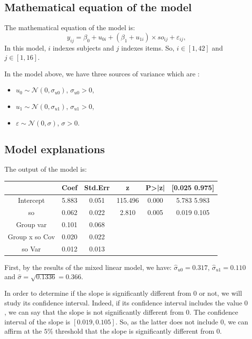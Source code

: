 \documentclass{article}
\begin{document}
\subsection{Mathematical equation of the model}
The mathematical equation of the model is:
\[y_{ij}= \beta_0 + u_{0i} + (\beta_1 + u_{1i}) \times so_{ij} + \varepsilon_{ij},\]
In this model, $i$ indexes subjects and $j$ indexes items. So, $i \in [1,42]$ and $j \in [1,16]$.

In the model above, we have three sources of variance which are :
\begin{itemize}
    \item $u_0 \sim \mathcal{N}(0,\sigma_{u0})$, $\sigma_{u0}>0$,
    \item $u_1 \sim \mathcal{N}(0,\sigma_{u1})$, $\sigma_{u1}>0$,
    \item $\varepsilon \sim \mathcal{N}(0, \sigma)$, $\sigma>0$.
\end{itemize}

\subsection{Model explanations}
The output of the model is:
\begin{center}
    \begin{tabular}{|c|c|c|c|c|c|}
    \hline
         & Coef & Std.Err & z & P>|z| & [0.025 0.975]  \\
         \hline \hline
        Intercept & 5.883 & 0.051 & 115.496 & 0.000 & 5.783 5.983\\
         so & 0.062 & 0.022 & 2.810 & 0.005 & 0.019 0.105 \\
         Group var &  0.101 & 0.068 &  & & \\
         Group x so Cov & 0.020 & 0.022 & & &\\
         so Var & 0.012 & 0.013 & & &\\
         \hline
    \end{tabular}
\end{center}

First, by the results of the mixed linear model, we have:
$\hat{\sigma}_{u0}=0.317$, $\hat{\sigma}_{u1}=0.110$ and $\hat{\sigma}=\sqrt{0.1336}=0.366$.

In order to determine if the slope is significantly different from $0$ or not, we will study its confidence interval.
Indeed, if its confidence interval includes the value $0$, we can say that the slope is not significantly different from $0$.
The confidence interval of the slope is $[0.019, 0.105]$. So, as the latter does not include $0$, we can affirm at the $5\%$ threshold that the slope is significantly different from $0$.
\end{document}

